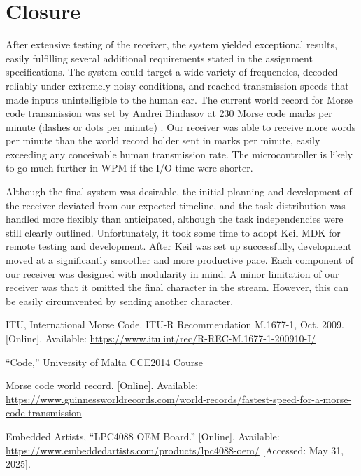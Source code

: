 \documentclass[head=13.6pt]{cce2014-design}
\begin{document}
\section{Closure}
After extensive testing of the receiver, the system yielded exceptional results, easily fulfilling several additional requirements stated in the assignment specifications. The system could target a wide variety of frequencies, decoded reliably under extremely noisy conditions, and reached transmission speeds that made inputs unintelligible to the human ear. The current world record for Morse code transmission was set by Andrei Bindasov at 230 Morse code marks per minute (dashes or dots per minute) \cite{morseworldrecord}. Our receiver was able to receive more words per minute than the world record holder sent in marks per minute, easily exceeding any conceivable human transmission rate. The microcontroller is likely to go much further in WPM if the I/O time were shorter.

Although the final system was desirable, the initial planning and development of the receiver deviated from our expected timeline, and the task distribution was handled more flexibly than anticipated, although the task independencies were still clearly outlined. Unfortunately, it took some time to adopt Keil MDK for remote testing and development. After Keil was set up successfully, development moved at a significantly smoother and more productive pace. Each component of our receiver was designed with modularity in mind. A minor limitation of our receiver was that it omitted the final character in the stream. However, this can be easily circumvented by sending another character.

\nocite{itu}

\begin{thebibliography}{9}

ITU, International Morse Code. ITU-R Recommendation M.1677-1, Oct. 2009. [Online]. Available: \url{https://www.itu.int/rec/R-REC-M.1677-1-200910-I/}

“Code,” University of Malta CCE2014 Course

Morse code world record. [Online]. Available: \url{https://www.guinnessworldrecords.com/world-records/fastest-speed-for-a-morse-code-transmission}

Embedded Artists, “LPC4088 OEM Board.” [Online]. Available: \url{https://www.embeddedartists.com/products/lpc4088-oem/} [Accessed: May 31, 2025].

\end{thebibliography}
\end{document}
